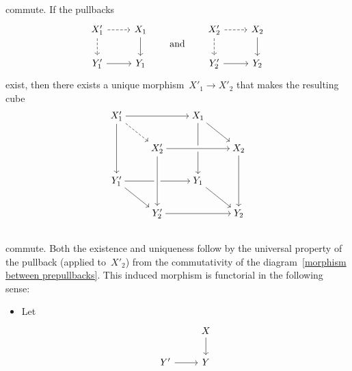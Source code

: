\begin{remark*}
\begin{enumerate}
\begin{equation}
\begin{tikzcd}[cramped]
        \end{tikzcd}
      \end{equation}
      commute.
      If the pullbacks
      \[
        \begin{tikzcd}
            X'_1
            \arrow[dashed]{r}
            \arrow[dashed]{d}
          & X_1
            \arrow{d}
          \\
            Y'_1
            \arrow{r}
          & Y_1
        \end{tikzcd}
        \qquad\text{and}\qquad
        \begin{tikzcd}
            X'_2
            \arrow[dashed]{r}
            \arrow[dashed]{d}
          & X_2
            \arrow{d}
          \\
            Y'_2
            \arrow{r}
          & Y_2
        \end{tikzcd}
      \]
      exist, then there exists a unique morphism~$X'_1 \to X'_2$ that makes the resulting cube
      \[
        \begin{tikzcd}[cramped]
            X'_1
            \arrow{rr}
            \arrow[dashed]{dr}
            \arrow{dd}
          & {}
          & X_1
            \arrow{dd}
            \arrow{dr}
          & {}
          \\
            {}
          & X'_2
          & {}
          & X_2
            \arrow[from=ll, crossing over]
            \arrow{dd}
          \\
            Y'_1
            \arrow{rr}
            \arrow{dr}
          & {}
          & Y_1
            \arrow{dr}
          & {}
          \\
            {}
          & Y'_2
            \arrow[from=uu, crossing over]
            \arrow{rr}
          & {}
          & Y_2
          \\
        \end{tikzcd}
      \]
      commute.
      Both the existence and uniqueness follow by the universal property of the pullback (applied to~$X'_2$) from the commutativity of the diagram~\eqref{morphism between prepullbacks}.
      This induced morphism is functorial in the following sense:
      \begin{itemize}
        \item
          Let
          \[
            \begin{tikzcd}
                {}
              & X
                \arrow{d}
              \\
                Y'
                \arrow{r}
              & Y
            \end{tikzcd}
\]
\end{itemize}
\end{enumerate}
\end{remark*}
